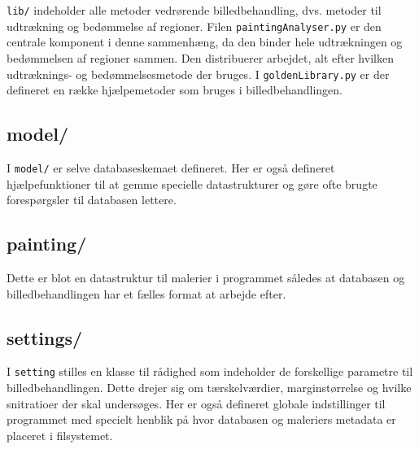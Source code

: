 {\texttt{lib/} indeholder alle metoder vedrørende billedbehandling, dvs.
metoder til udtrækning og bedømmelse af regioner. Filen
\texttt{paintingAnalyser.py} er den centrale komponent i denne
sammenhæng, da den binder hele udtrækningen og bedømmelsen af regioner
sammen. Den distribuerer arbejdet, alt efter hvilken udtræknings- og
bedømmelsesmetode der bruges.  I \texttt{goldenLibrary.py} er der
defineret en række hjælpemetoder som bruges i billedbehandlingen.

\subsection{model/}
\vspace{1.2em}

I \texttt{model/} er selve databaseskemaet defineret. Her er også
defineret hjælpefunktioner til at gemme specielle datastrukturer og
gøre ofte brugte forespørgsler til databasen lettere.

\subsection{painting/}
\vspace{1.2em}

Dette er blot en datastruktur til malerier i programmet således at
databasen og billedbehandlingen har et fælles format at arbejde efter.

\subsection{settings/}
\vspace{1.2em}

I \texttt{setting} stilles en klasse til rådighed som indeholder de
forskellige parametre til billedbehandlingen. Dette drejer sig om
tærskelværdier, marginstørrelse og hvilke snitratioer der skal
undersøges. Her er også defineret globale indstillinger til programmet
med specielt henblik på hvor databasen og maleriers metadata er placeret
i filsystemet.

}

